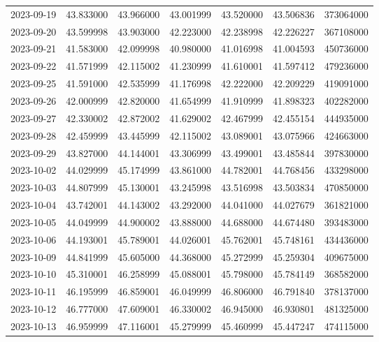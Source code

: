 \begin{tabular}{lrrrrrr}
2023-09-19 &   43.833000 &   43.966000 &   43.001999 &   43.520000 &   43.506836 &   373064000 \\
2023-09-20 &   43.599998 &   43.903000 &   42.223000 &   42.238998 &   42.226227 &   367108000 \\
2023-09-21 &   41.583000 &   42.099998 &   40.980000 &   41.016998 &   41.004593 &   450736000 \\
2023-09-22 &   41.571999 &   42.115002 &   41.230999 &   41.610001 &   41.597412 &   479236000 \\
2023-09-25 &   41.591000 &   42.535999 &   41.176998 &   42.222000 &   42.209229 &   419091000 \\
2023-09-26 &   42.000999 &   42.820000 &   41.654999 &   41.910999 &   41.898323 &   402282000 \\
2023-09-27 &   42.330002 &   42.872002 &   41.629002 &   42.467999 &   42.455154 &   444935000 \\
2023-09-28 &   42.459999 &   43.445999 &   42.115002 &   43.089001 &   43.075966 &   424663000 \\
2023-09-29 &   43.827000 &   44.144001 &   43.306999 &   43.499001 &   43.485844 &   397830000 \\
2023-10-02 &   44.029999 &   45.174999 &   43.861000 &   44.782001 &   44.768456 &   433298000 \\
2023-10-03 &   44.807999 &   45.130001 &   43.245998 &   43.516998 &   43.503834 &   470850000 \\
2023-10-04 &   43.742001 &   44.143002 &   43.292000 &   44.041000 &   44.027679 &   361821000 \\
2023-10-05 &   44.049999 &   44.900002 &   43.888000 &   44.688000 &   44.674480 &   393483000 \\
2023-10-06 &   44.193001 &   45.789001 &   44.026001 &   45.762001 &   45.748161 &   434436000 \\
2023-10-09 &   44.841999 &   45.605000 &   44.368000 &   45.272999 &   45.259304 &   409675000 \\
2023-10-10 &   45.310001 &   46.258999 &   45.088001 &   45.798000 &   45.784149 &   368582000 \\
2023-10-11 &   46.195999 &   46.859001 &   46.049999 &   46.806000 &   46.791840 &   378137000 \\
2023-10-12 &   46.777000 &   47.609001 &   46.330002 &   46.945000 &   46.930801 &   481325000 \\
2023-10-13 &   46.959999 &   47.116001 &   45.279999 &   45.460999 &   45.447247 &   474115000 \\

\end{tabular}

